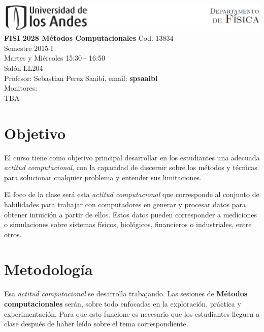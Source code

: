 \documentclass[11pt]{article}
\begin{document}
\includegraphics[width=490pt]{header.png}\\[0.5cm]

\noindent
\textbf{FISI 2028 Métodos Computacionales}
Cod. 13834\\
Semestre 2015-I\\
Martes y Mi\'ercoles 15:30 - 16:50 \\
Sal\'on LL204\\
Profesor: Sebastian Perez Saaibi, email: \textbf{spsaaibi}\\
Monitores: \\
TBA \\


\section*{Objetivo}
El curso tiene como objetivo principal desarrollar en los
estudiantes una adecuada \emph{actitud computacional}, con la capacidad de
discernir sobre los m\'etodos y t\'ecnicas para solucionar cualquier 
problema y entender sus limitaciones.
 
El foco de la clase ser\'a esta \emph{actitud computacional} que
corresponde al conjunto de habilidades para trabajar con computadores
en generar y procesar datos para obtener intuici\'on a partir de ellos. Estos datos pueden
corresponder a mediciones o simulaciones sobre sistemas f\'isicos, biol\'ogicos, financieros o industriales, entre otros.

\section*{Metodolog\'ia}
Esa \emph{actitud computacional} se desarrolla trabajando. Las
sesiones de \textbf{M\'etodos computacionales} ser\'an, sobre todo 
enfocadas en la exploraci\'on, pr\'actica y experimentaci\'on. Para que esto
funcione es necesario que los estudiantes lleguen a clase despu\'es de
haber le\'ido sobre el tema correspondiente. 
\end{document}

